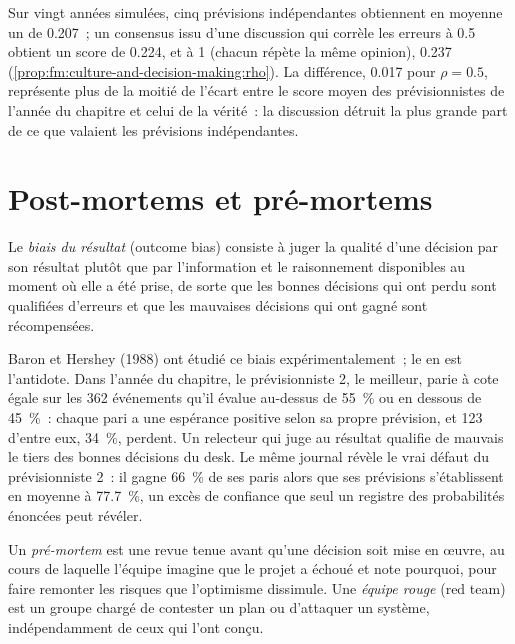 Sur vingt années simulées, cinq prévisions indépendantes obtiennent en moyenne un  de 0.207~; un consensus issu d'une discussion qui corrèle les erreurs à
0.5 obtient un score de 0.224, et à 1 (chacun répète la même opinion), 0.237 (\cref{prop:fm:culture-and-decision-making:rho}). La différence, 0.017 pour
$\rho=0.5$, représente plus de la moitié de l'écart entre le score moyen des prévisionnistes de l'année du chapitre et celui de la vérité~: la discussion détruit la plus grande part de ce que valaient les
prévisions indépendantes.

\section{Post-mortems et pré-mortems}

\begin{definition}\label{def:fm:culture-and-decision-making:outcome}
Le \emph{biais du résultat} (outcome bias) consiste à juger la qualité d'une décision par son résultat plutôt que par l'information et le raisonnement disponibles
au moment où elle a été prise, de sorte que les bonnes décisions qui ont perdu sont qualifiées d'erreurs et que les mauvaises décisions qui ont gagné sont récompensées.
\end{definition}

Baron et Hershey (1988) ont étudié ce biais expérimentalement~; le  en est l'antidote. Dans l'année du chapitre, le prévisionniste 2, le meilleur, parie à
cote égale sur les 362 événements qu'il évalue au-dessus de 55~\% ou en dessous de 45~\%~: chaque pari a une espérance positive selon sa propre prévision, et 123 d'entre eux, 34~\%,
perdent. Un relecteur qui juge au résultat qualifie de mauvais le tiers des bonnes décisions du desk. Le même journal révèle le vrai défaut du prévisionniste 2~: il gagne
66~\% de ses paris alors que ses prévisions s'établissent en moyenne à 77.7~\%, un excès de confiance que seul un registre des probabilités énoncées peut révéler.

\begin{definition}\label{def:fm:culture-and-decision-making:premortem}
Un \emph{pré-mortem} est une revue tenue avant qu'une décision soit mise en œuvre, au cours de laquelle l'équipe imagine que le projet a échoué et
note pourquoi, pour faire remonter les risques que l'optimisme dissimule. Une \emph{équipe rouge} (red team) est un groupe chargé de contester un plan ou d'attaquer un
système, indépendamment de ceux qui l'ont conçu.
\end{definition}

